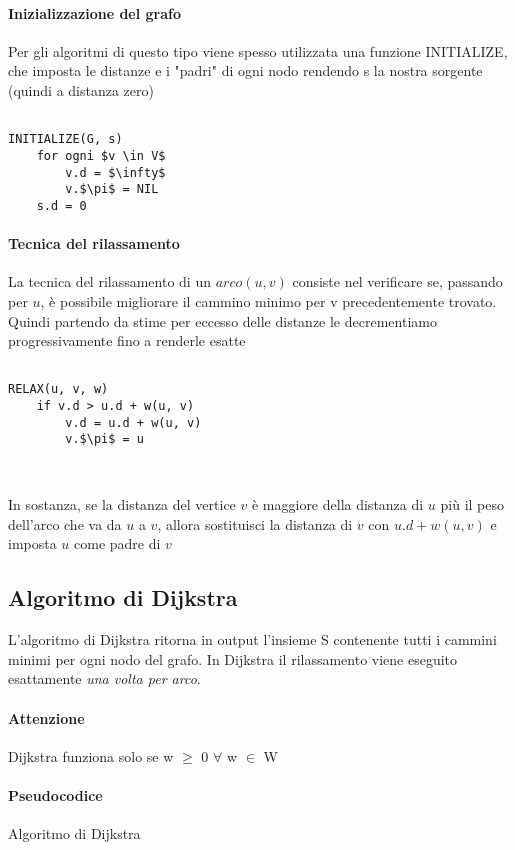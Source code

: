 \paragraph*{Inizializzazione del grafo}
Per gli algoritmi di questo tipo viene spesso utilizzata una funzione INITIALIZE, che imposta
le distanze e i "padri" di ogni nodo rendendo s la nostra sorgente (quindi a distanza zero)

\begin{lstlisting}

INITIALIZE(G, s)
    for ogni $v \in V$
        v.d = $\infty$
        v.$\pi$ = NIL
    s.d = 0
\end{lstlisting}

\paragraph{Tecnica del rilassamento}
La tecnica del rilassamento di un $arco (u,v)$ consiste nel verificare se, passando per $u$, è possibile migliorare il cammino minimo
per v precedentemente trovato. Quindi partendo da stime per eccesso delle distanze le decrementiamo progressivamente
fino a renderle esatte

\begin{lstlisting}

RELAX(u, v, w)
    if v.d > u.d + w(u, v)
        v.d = u.d + w(u, v)
        v.$\pi$ = u
    
    
\end{lstlisting}

In sostanza, se la distanza del vertice $v$ è maggiore della distanza di $u$ più il peso
dell'arco che va da $u$ a $v$, allora sostituisci la distanza di $v$ con $u.d + w(u, v)$
e imposta $u$ come padre di $v$

\subsection{Algoritmo di Dijkstra}
L'algoritmo di Dijkstra ritorna in output l'insieme S contenente tutti i cammini minimi per ogni nodo del grafo.
In Dijkstra il rilassamento viene eseguito esattamente \emph{una volta per arco}.

\paragraph{Attenzione}
Dijkstra funziona solo se w $\geq$  0 $\forall$ w $\in$ W

\paragraph{Pseudocodice} Algoritmo di Dijkstra

